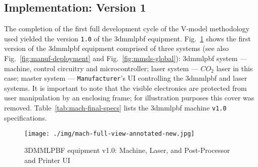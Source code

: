 \subsection{Implementation: Version 1}%
\label{sec:version-1}
The completion of the first full development cycle of
the V-model methodology used yielded the
version \texttt{1.0} of the \gls{3dmmlpbf} equipment.
%
Fig.~\ref{fig:mach-full-view-annotated} shows the first version of the \gls{3dmmlpbf} equipment
comprised of three systems (see also Fig.~\ref{fig:manuf-deployment} and Fig.~\ref{fig:mmsls-global}): \gls{3dmmlpbf} system
--- machine, control circuitry and microcontroller; laser system --- $CO_2$
laser in this case; master system --- \texttt{Manufacturer}'s UI controlling the
\gls{3dmmlpbf} and laser systems. It is important to note that the visible
electronics are protected from user manipulation by an enclosing frame; for
illustration purposes this cover was removed. Table~\ref{tab:mach-final-specs}
lists the \gls{3dmmlpbf} machine \texttt{v1.0} specifications.
%
\begin{figure}[!hbt]
  \centering
    \texttt{[image: ./img/mach-full-view-annotated-new.jpg]}
  \caption{3DMMLPBF equipment v1.0: Machine, Laser, and Post-Processor and Printer UI}%
\label{fig:mach-full-view-annotated}
\end{figure}
%
\begin{table}[!hbt]
\centering
\caption{\gls{3dmmlpbf} machine v1.0 specifications}%
\label{tab:mach-final-specs}
\end{table}

